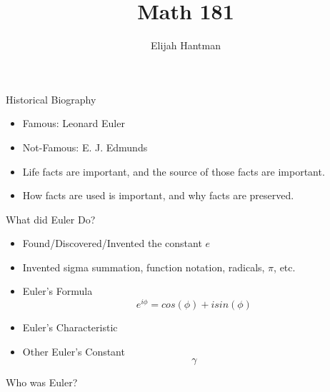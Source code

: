 \documentclass{report}
\title{\Huge{Math 181}}
\author{\huge{Elijah Hantman}}
\date{}
\begin{document}
\maketitle
\newpage

\begin{description}
    \item Historical Biography
        \begin{itemize}
            \item Famous: Leonard Euler
            \item Not-Famous: E. J. Edmunds
        \end{itemize}
        \begin{itemize}
            \item 
                \begin{mdframed}
                    Life facts are important, and the source of those
                    facts are important.
                \end{mdframed}
            \item 
                \begin{mdframed}
                    How facts are used is important, and why
                    facts are preserved.
                \end{mdframed}
        \end{itemize}
    \item {\large What did Euler Do?}
        \begin{itemize}
            \item Found/Discovered/Invented the constant $e$ 
            \item Invented sigma summation, function notation,
                radicals, $\pi$, etc.
            \item Euler's Formula
                \begin{displaymath}
                    e^{i\phi} = cos(\phi)+isin(\phi)
                \end{displaymath}
            \item Euler's Characteristic
            \item Other Euler's Constant
                \begin{displaymath}
                    \gamma
                \end{displaymath}
        \end{itemize}
    \item {\large Who was Euler?}
        \begin{mdframed}
            \begin{itemize}

\end{itemize}
\end{mdframed}
\end{description}
\end{document}
